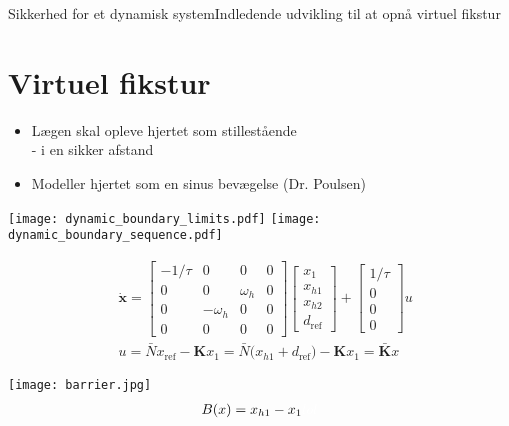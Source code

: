 \begin{frame}{Sikkerhed for et dynamisk system}{Indledende udvikling til at opnå virtuel fikstur}
\section{Virtuel fikstur}
\vspace*{-0.2cm}
\begin{block}{}
	\begin{itemize}
		\item Lægen skal opleve hjertet som stillestående \\
		\scriptsize - i en sikker afstand
		\item \normalsize Modeller hjertet som en sinus bevægelse (Dr. Poulsen)
	\end{itemize}
\end{block}
\texttt{[image: dynamic\_boundary\_limits.pdf]} \hspace*{0.4cm}
\texttt{[image: dynamic\_boundary\_sequence.pdf]}

\begin{minipage}{0.7\textwidth}
\scriptsize
\begin{align*}
& \dot{\textbf{x}} = \begin{bmatrix}
-1/\tau & 0 & 0 & 0 \\
0 & 0 & \omega_h & 0 \\
0 & -\omega_h & 0 & 0 \\
0 & 0 & 0 & 0
\end{bmatrix} \begin{bmatrix}
x_1 \\ x_{h1} \\ x_{h2} \\ d_\text{ref}
\end{bmatrix} + \begin{bmatrix}
1/\tau \\ 0 \\ 0 \\ 0
\end{bmatrix} u \\
&  u = \bar{N} x_\text{ref} - \textbf{K} x_1 = \bar{N}\Big( x_{h1} + d_\text{ref} \Big) - \textbf{K} x_1 = \bar{\textbf{K}}x
\end{align*}
\end{minipage}
\hspace*{0.1cm}
\begin{minipage}{0.25\textwidth}
\vspace*{0.2cm}
\texttt{[image: barrier.jpg]}
\hspace*{-0.3cm}
\vspace*{-0.2cm} \scriptsize
\begin{align*}
B(x) =  x_{h1} - x_1 {\color{white}{lol}}
\end{align*}
\end{minipage}
\end{frame}

